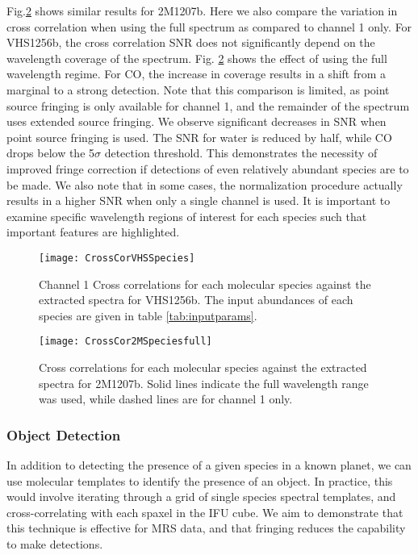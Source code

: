 Fig.\ref{fig:ccspec2mfull} shows similar results for 2M1207b. 
Here we also compare the variation in cross correlation when using the full spectrum as compared to channel 1 only. 
For VHS1256b, the cross correlation SNR does not significantly depend on the wavelength coverage of the spectrum.
Fig. \ref{fig:ccspec2mfull} shows the effect of using the full wavelength regime.
For CO, the increase in coverage results in a shift from a marginal to a strong detection.
Note that this comparison is limited, as point source fringing is only available for channel 1, and the remainder of the spectrum uses extended source fringing.
We observe significant decreases in SNR when point source fringing is used.
The SNR for water is reduced by half, while CO drops below the 5$\sigma$ detection threshold.
This demonstrates the necessity of improved fringe correction if detections of even relatively abundant species are to be made.
We also note that in some cases, the normalization procedure actually results in a higher SNR when only a single channel is used.
It is important to examine specific wavelength regions of interest for each species such that important features are highlighted.
\begin{figure}[t]
	\texttt{[image: CrossCorVHSSpecies]}
	\caption{Channel 1 Cross correlations for each molecular species against the extracted spectra for VHS1256b. The input abundances of each species are given in table \ref{tab:inputparams}. }
	\label{fig:ccspecvhs}
\end{figure}
\begin{figure}[h]
	\texttt{[image: CrossCor2MSpeciesfull]}
	\caption{Cross correlations for each molecular species against the extracted spectra for 2M1207b. Solid lines indicate the full wavelength range was used, while dashed lines are for channel 1 only.}
	\label{fig:ccspec2mfull}
\end{figure}

\subsubsection{Object Detection}
In addition to detecting the presence of a given species in a known planet, we can use molecular templates to identify the presence of an object.
In practice, this would involve iterating through a grid of single species spectral templates, and cross-correlating with each spaxel in the IFU cube.
We aim to demonstrate that this technique is effective for MRS data, and that fringing reduces the capability to make detections.

